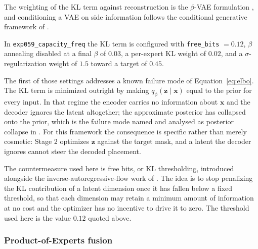 The weighting of the KL term against reconstruction is the $\beta$-VAE
formulation \cite{higgins2017beta}, and conditioning a VAE on side information
follows the conditional generative framework of \cite{sohn2015conditional}.

In \texttt{exp059\_capacity\_freq} the KL term is configured with
\texttt{free\_bits} $=0.12$, $\beta$ annealing disabled at a final $\beta$ of
$0.03$, a per-expert KL weight of $0.02$, and a $\sigma$-regularization weight of
$1.5$ toward a target of $0.45$.

The first of those settings addresses a known failure mode of
Equation~\ref{eq:elbo}. The KL term is minimized outright by making
$q_\phi(\mathbf{z}\mid\mathbf{x})$ equal to the prior for every input. In that
regime the encoder carries no information about $\mathbf{x}$ and the decoder
ignores the latent altogether; the approximate posterior has collapsed onto the
prior, which is the failure mode named and analysed as posterior collapse in
\cite{he2019posterior}. For this framework the consequence is
specific rather than merely cosmetic: Stage 2 optimizes $\mathbf{z}$ against the
target mask, and a latent the decoder ignores cannot steer the decoded placement.

The countermeasure used here is free bits, or KL thresholding, introduced
alongside the inverse-autoregressive-flow work of \cite{kingma2016iaf}. The idea
is to stop penalizing the KL contribution of a latent dimension once it has
fallen below a fixed threshold, so that each dimension may retain a minimum
amount of information at no cost and the optimizer has no incentive to drive it to
zero. The threshold used here is the value $0.12$ quoted above.

\subsubsection*{Product-of-Experts fusion}

